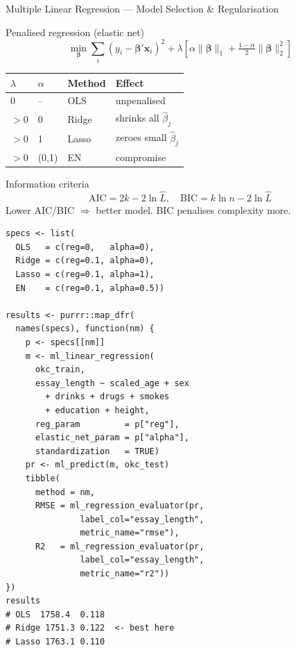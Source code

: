 \documentclass[11pt, aspectratio=169]{beamer}
\begin{document}
\begin{frame}{Multiple Linear Regression --- Model Selection \& Regularisation}
	\begin{block}{Penalised regression (elastic net)}
				\[
				\min_{\bm\beta}
				\sum_i (y_i - \bm\beta'\mathbf{x}_i)^2
				+ \lambda\!\left[
				\alpha \|\bm\beta\|_1
				+ \tfrac{1-\alpha}{2}\|\bm\beta\|_2^2
				\right]
				\]
				\footnotesize
				\begin{tabular}{llll}
					\toprule
					$\lambda$ & $\alpha$ & Method & Effect\\
					\midrule
					0       & --  & OLS   & unpenalised\\
					$>$0    & 0   & Ridge & shrinks all $\hat\beta_j$\\
					$>$0    & 1   & Lasso & zeroes small $\hat\beta_j$\\
					$>$0    & (0,1) & EN  & compromise\\
					\bottomrule
				\end{tabular}
			\end{block}
			\begin{block}{Information criteria}
				\[
				\mathrm{AIC} = 2k - 2\ln\hat L,
				\quad
				\mathrm{BIC} = k\ln n - 2\ln\hat L
				\]
				Lower AIC/BIC $\Rightarrow$ better model.
				BIC penalises complexity more.
			\end{block}
		\begin{lstlisting}[title={OLS vs Ridge vs Lasso on OkCupid}]
specs <- list(
  OLS   = c(reg=0,   alpha=0),
  Ridge = c(reg=0.1, alpha=0),
  Lasso = c(reg=0.1, alpha=1),
  EN    = c(reg=0.1, alpha=0.5))

results <- purrr::map_dfr(
  names(specs), function(nm) {
    p <- specs[[nm]]
    m <- ml_linear_regression(
      okc_train,
      essay_length ~ scaled_age + sex
        + drinks + drugs + smokes
        + education + height,
      reg_param         = p["reg"],
      elastic_net_param = p["alpha"],
      standardization   = TRUE)
    pr <- ml_predict(m, okc_test)
    tibble(
      method = nm,
      RMSE = ml_regression_evaluator(pr,
               label_col="essay_length",
               metric_name="rmse"),
      R2   = ml_regression_evaluator(pr,
               label_col="essay_length",
               metric_name="r2"))
})
results
# OLS  1758.4  0.118
# Ridge 1751.3 0.122  <- best here
# Lasso 1763.1 0.110
			\end{lstlisting}
		\end{frame}
\end{document}
